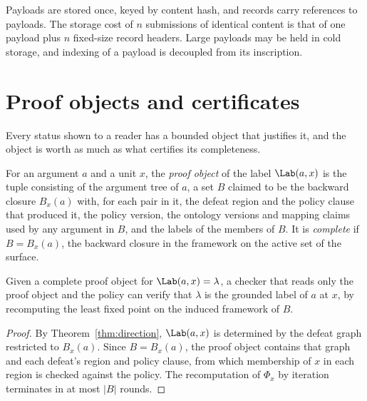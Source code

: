 \begin{designrule}\label{rule:cas}
Payloads are stored once, keyed by content hash, and records carry references to payloads. The storage cost of $n$ submissions of identical content is that of one payload plus $n$ fixed-size record headers. Large payloads may be held in cold storage, and indexing of a payload is decoupled from its inscription.
\end{designrule}

\section{Proof objects and certificates}\label{sec:proofobjects}

Every status shown to a reader has a bounded object that justifies it, and the object is worth as much as what certifies its completeness.

\begin{definition}\label{def:proofobject}
For an argument $a$ and a unit $x$, the \emph{proof object} of the label $\Lab(a,x)$ is the tuple consisting of the argument tree of $a$, a set $B$ claimed to be the backward closure $B_x(a)$ with, for each pair in it, the defeat region and the policy clause that produced it, the policy version, the ontology versions and mapping claims used by any argument in $B$, and the labels of the members of $B$. It is \emph{complete} if $B=B_x(a)$, the backward closure in the framework on the active set of the surface.
\end{definition}

\begin{proposition}\label{prop:proofcheck}
Given a complete proof object for $\Lab(a,x)=\lambda$, a checker that reads only the proof object and the policy can verify that $\lambda$ is the grounded label of $a$ at $x$, by recomputing the least fixed point on the induced framework of $B$.
\end{proposition}

\begin{proof}
By Theorem~\ref{thm:direction}, $\Lab(a,x)$ is determined by the defeat graph restricted to $B_x(a)$. Since $B=B_x(a)$, the proof object contains that graph and each defeat's region and policy clause, from which membership of $x$ in each region is checked against the policy. The recomputation of $\Phi_x$ by iteration terminates in at most $|B|$ rounds.
\end{proof}

